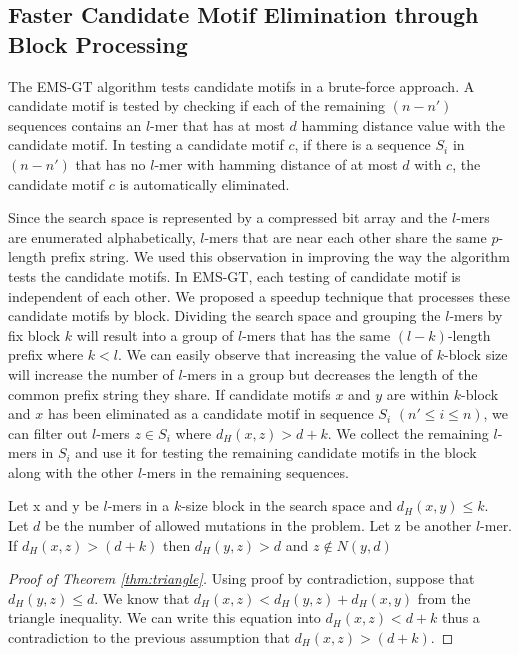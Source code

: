 
\subsection{Faster Candidate Motif Elimination through Block Processing}

The EMS-GT algorithm tests candidate motifs in a brute-force approach. A candidate motif is tested by checking if each of the remaining $(n - n')$ sequences contains an $l$-mer that has at most $d$ hamming distance value with the candidate motif. In testing a candidate motif $c$, if there is a sequence $S_i$ in $(n - n')$ that has no $l$-mer with hamming distance of at most $d$ with $c$, the candidate motif $c$ is automatically eliminated.

Since the search space is represented by a compressed bit array and the $l$-mers are enumerated alphabetically, $l$-mers that are near each other share the same $p$-length prefix string. We used this observation in improving the way the algorithm tests the candidate motifs. In EMS-GT, each testing of candidate motif is independent of each other. We proposed a speedup technique that processes these candidate motifs by block. Dividing the search space and grouping the $l$-mers by fix block $k$ will result into a group of $l$-mers that has the same $(l - k)$-length prefix where $k < l$. We can easily observe that increasing the value of $k$-block size will increase the number of $l$-mers in a group but decreases the length of the common prefix string they share. If candidate motifs $x$ and $y$ are within $k$-block and $x$ has been eliminated as a candidate motif in sequence $S_i$ $(n' \leq i \leq n)$, we can filter out $l$-mers $z \in S_i$ where $d_H(x,z) > d + k$. We collect the remaining $l$-mers in $S_i$ and use it for testing the remaining candidate motifs in the block along with the other $l$-mers in the remaining sequences. 

\begin{thm} \label{thm:triangle}
	Let x and y be $l$-mers in a $k$-size block in the search space and $d_H(x, y) \leq k$. Let $d$ be the number of allowed mutations in the problem. Let z be another $l$-mer. If $d_H(x, z) > (d + k)$ then $d_H(y, z) > d$ and $z \not\in N(y, d)$
\end{thm}

\begin{proof}[Proof of Theorem \ref{thm:triangle}]
Using proof by contradiction, suppose that $d_H(y, z) \leq d$. We know that $d_H(x, z) < d_H(y, z) + d_H(x, y)$ from the triangle inequality. We can write this equation into $d_H(x, z) < d + k$ thus a contradiction to the previous assumption that $d_H(x, z) > (d + k)$.
\end{proof}